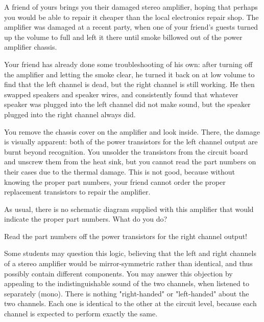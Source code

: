 

A friend of yours brings you their damaged stereo amplifier, hoping that perhaps you would be able to repair it cheaper than the local electronics repair shop.  The amplifier was damaged at a recent party, when one of your friend's guests turned up the volume to full and left it there until smoke billowed out of the power amplifier chassis.

Your friend has already done some troubleshooting of his own: after turning off the amplifier and letting the smoke clear, he turned it back on at low volume to find that the left channel is dead, but the right channel is still working.  He then swapped speakers and speaker wires, and consistently found that whatever speaker was plugged into the left channel did not make sound, but the speaker plugged into the right channel always did.

You remove the chassis cover on the amplifier and look inside.  There, the damage is visually apparent: both of the power transistors for the left channel output are burnt beyond recognition.  You unsolder the transistors from the circuit board and unscrew them from the heat sink, but you cannot read the part numbers on their cases due to the thermal damage.  This is not good, because without knowing the proper part numbers, your friend cannot order the proper replacement transistors to repair the amplifier.

As usual, there is no schematic diagram supplied with this amplifier that would indicate the proper part numbers.  What do you do?







Read the part numbers off the power transistors for the right channel output!







Some students may question this logic, believing that the left and right channels of a stereo amplifier would be mirror-symmetric rather than identical, and thus possibly contain different components.  You may answer this objection by appealing to the indistinguishable sound of the two channels, when listened to separately (mono).  There is nothing "right-handed" or "left-handed" about the two channels.  Each one is identical to the other at the circuit level, because each channel is expected to perform exactly the same.




